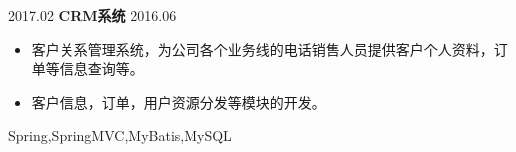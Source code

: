 \begin{projects}
  \project
    {2017.02}   {\textbf{CRM系统}}
    {2016.06} {
                      \begin{itemize}
                        \item 客户关系管理系统，为公司各个业务线的电话销售人员提供客户个人资料，订单等信息查询等。
                        \item 客户信息，订单，用户资源分发等模块的开发。
                      \end{itemize}
                    }
                    {Spring,SpringMVC,MyBatis,MySQL}
  \emptySeparator
\end{projects}
